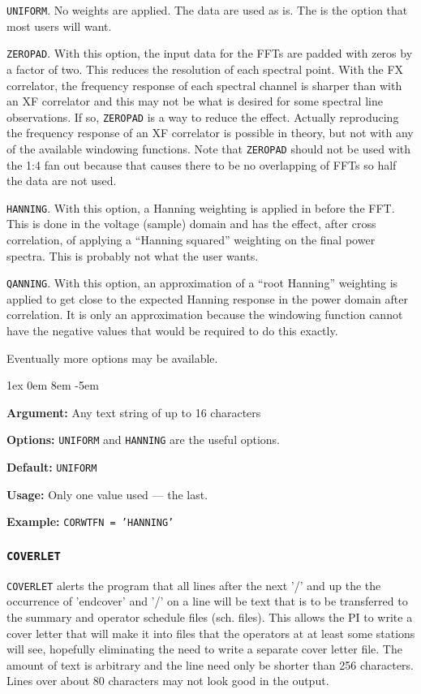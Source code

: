 \documentclass{report}
\newcommand{\rcwbox}[5]{
  \begin{list}{}{\parsep 1ex  \itemsep 0em
                 \leftmargin 8em  \itemindent -5em }
    \item {\bf Argument:} #1
    \item {\bf Options:}  #2
    \item {\bf Default:}  #3
    \item {\bf Usage:}    #4
    \item {\bf Example:}  #5
  \end{list}
}
\begin{document}
\begin{list}{}{\parsep 0em  \itemsep 0em }

\item {\tt UNIFORM}.  No weights are applied.  The data are used
as is.  The is the option that most users will want.

\item {\tt ZEROPAD}.  With this option, the input data for the
FFTs are padded with zeros by a factor of two.  This reduces the
resolution of each spectral point.  With the FX correlator, the
frequency response of each spectral channel is sharper than with
an XF correlator and this may not be what is desired for some
spectral line observations.  If so, {\tt ZEROPAD} is a way to
reduce the effect.  Actually reproducing the frequency response
of an XF correlator is possible in theory, but not with any
of the available windowing functions.  Note that {\tt ZEROPAD}
should not be used with the 1:4 fan out because that causes
there to be no overlapping of FFTs so half the data are not used.

\item {\tt HANNING}.  With this option, a Hanning weighting is
applied in before the FFT.  This is done in the voltage (sample)
domain and has the effect, after cross correlation, of applying
a ``Hanning squared'' weighting on the final power spectra.  This
is probably not what the user wants.

\item {\tt QANNING}.  With this option, an approximation of a
``root Hanning'' weighting is applied to get close to the expected
Hanning response in the power domain after correlation.  It is
only an approximation because the windowing function cannot have
the negative values that would be required to do this exactly.

\end{list}

Eventually more options may be available.

\rcwbox
{Any text string of up to 16 characters}
{{\tt UNIFORM} and {\tt HANNING} are the useful options.}
{{\tt UNIFORM}}
{Only one value used --- the last.}
{{\tt CORWTFN = 'HANNING'}}

\subsubsection{\label{MP:COVERLET}{\tt COVERLET}}

{\tt COVERLET} alerts the program that all lines after the next '/'
and up the the occurrence of 'endcover' and '/' on a line will be text
that is to be transferred to the summary and operator schedule files
(sch. files).  This allows the PI to write a cover letter that will
make it into files that the operators at at least some stations will
see, hopefully eliminating the need to write a separate cover letter
file.  The amount of text is arbitrary and the line need only be
shorter than 256 characters.  Lines over about 80 characters may not
look good in the output.
\end{document}
